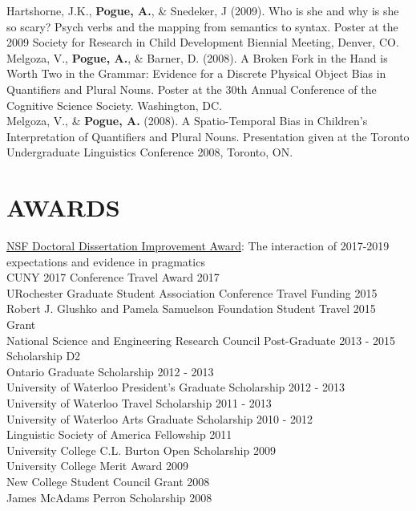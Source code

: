 \documentclass[margin, 7pt]{res} %
\begin{document}
\begin{resume}
Hartshorne, J.K., {\bf Pogue, A.}, \& Snedeker, J (2009). Who is she and why is she so scary? Psych verbs and the mapping from semantics to syntax. Poster at the 2009 Society for Research in Child Development Biennial Meeting, Denver, CO. \medskip \\
Melgoza, V., {\bf Pogue, A.}, \& Barner, D. (2008). A Broken Fork in the Hand is Worth Two in the Grammar: Evidence for a Discrete Physical Object Bias in Quantifiers and Plural Nouns. Poster at the 30th Annual Conference of the Cognitive Science Society. Washington, DC. \medskip \\
Melgoza, V., \& {\bf Pogue, A.} (2008). A Spatio-Temporal Bias in Children's Interpretation of Quantifiers and Plural Nouns. Presentation given at the Toronto Undergraduate Linguistics Conference 2008, Toronto, ON. \\

 
\section{AWARDS}

\href{https://www.nsf.gov/awardsearch/showAward?AWD_ID=1727336}{NSF Doctoral Dissertation Improvement Award}: The interaction of  \hfill 2017-2019 \\
expectations and evidence in pragmatics \\
CUNY 2017 Conference Travel Award \hfill 2017 \\
URochester Graduate Student Association Conference Travel Funding \hfill 2015 \\
Robert J. Glushko and Pamela Samuelson Foundation Student Travel  \hfill 2015 \\
Grant \\
National Science and Engineering Research Council Post-Graduate \hfill 2013 - 2015 \\ 
Scholarship D2  \\
Ontario Graduate Scholarship \hfill 2012 - 2013 \\
University of Waterloo President's Graduate Scholarship \hfill 2012 - 2013 \\
University of Waterloo Travel Scholarship \hfill 2011 - 2013 \\
University of Waterloo Arts Graduate Scholarship \hfill 2010 - 2012 \\
Linguistic Society of America Fellowship \hfill 2011 \\
University College C.L. Burton Open Scholarship \hfill 2009 \\
University College Merit Award \hfill 2009 \\
New College Student Council Grant \hfill 2008 \\
James McAdams Perron Scholarship \hfill 2008 \\


\end{resume}
\end{document}
